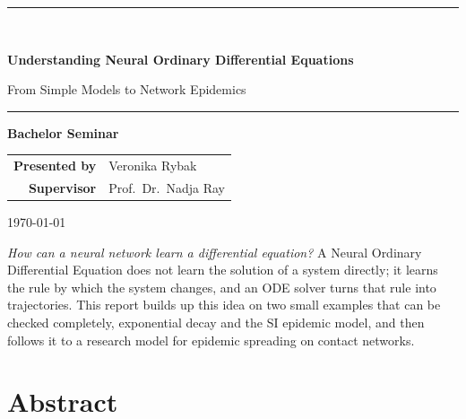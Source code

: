 \documentclass[11pt,a4paper]{article}
\begin{document}
\hypersetup{pageanchor=false}

\begin{titlepage}
\centering
\vspace*{0.8cm}

\vfill

\rule{\linewidth}{0.5pt}\\[0.7cm]
{\Huge\bfseries Understanding Neural Ordinary Differential Equations\par}
\vspace{0.5cm}
{\LARGE From Simple  Models to Network Epidemics\par}
\vspace{0.7cm}
\rule{\linewidth}{0.5pt}

\vfill

{\large\bfseries Bachelor Seminar}\\[1.6cm]

\begin{tabular}{rl}
\textbf{Presented by} & Veronika Rybak \\[4pt]
\textbf{Supervisor}   & Prof.\ Dr.\ Nadja Ray \\
\end{tabular}

\vfill
{\footnotesize\today}
\end{titlepage}

\hypersetup{pageanchor=true}

\tableofcontents
\newpage
{}

\begin{kaobox}[title=Central question of the seminar]
\emph{How can a neural network learn a differential equation?}
A Neural Ordinary Differential Equation does not learn the solution of a system
directly; it learns the rule by which the system changes, and an ODE solver turns
that rule into trajectories. This report builds up this idea on two small
examples that can be checked completely, exponential decay and the SI epidemic
model, and then follows it to a research model for epidemic spreading on contact
networks.
\end{kaobox}

\section*{Abstract}
\end{document}
